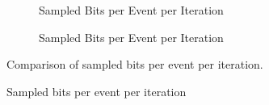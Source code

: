 \begin{landscape}
\begin{figure}
    \centering
    \begin{subfigure}[t]{0.663\textwidth}
        \centering
        
        \caption{Sampled Bits per Event per Iteration}
        \label{fig:canopy_rel_error_plot_1}
    \end{subfigure}
    \hfill
    \begin{subfigure}[t]{0.659\textwidth}
        \centering
        
        \caption{Sampled Bits per Event per Iteration}
        \label{fig:canopy_rel_error_plot_2}
    \end{subfigure}
    \caption{Comparison of sampled bits per event per iteration.}
\end{figure}
\end{landscape}

\begin{figure}
    
    \caption{Sampled bits per event per iteration}
    \label{fig:sampled_bits_mem}
\end{figure}